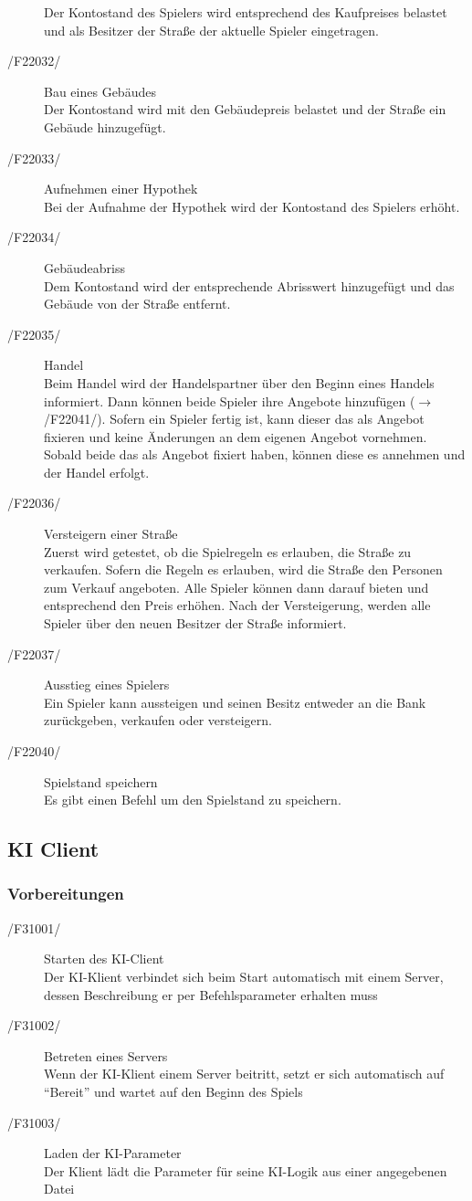 \documentclass[a4paper,10pt]{article}
\begin{document}
\begin{description}
Der Kontostand des Spielers wird entsprechend des Kaufpreises belastet und als Besitzer der Straße der aktuelle Spieler eingetragen.
\item[/F22032/] Bau eines Gebäudes \\
Der Kontostand wird mit den Gebäudepreis belastet und der Straße ein Gebäude hinzugefügt.
\item[/F22033/] Aufnehmen einer Hypothek \\
Bei der Aufnahme der Hypothek wird der Kontostand des Spielers erhöht.
\item[/F22034/] Gebäudeabriss \\
Dem Kontostand wird der entsprechende Abrisswert hinzugefügt und das Gebäude von der Straße entfernt.
\item[/F22035/] Handel \\
Beim Handel wird der Handelspartner über den Beginn eines Handels informiert. Dann können beide Spieler ihre Angebote hinzufügen ($\rightarrow$ /F22041/). Sofern ein Spieler fertig ist, kann dieser das als Angebot fixieren und keine Änderungen an dem eigenen Angebot vornehmen. Sobald beide das als Angebot fixiert haben, können diese es annehmen und der Handel erfolgt.
\item[/F22036/] Versteigern einer Straße \\
Zuerst wird getestet, ob die Spielregeln es erlauben, die Straße zu verkaufen. Sofern die Regeln es erlauben, wird die Straße den Personen zum Verkauf angeboten. Alle Spieler können dann darauf bieten und entsprechend den Preis erhöhen. Nach der Versteigerung, werden alle Spieler über den neuen Besitzer der Straße informiert.
\item[/F22037/] Ausstieg eines Spielers \\
Ein Spieler kann aussteigen und seinen Besitz entweder an die Bank zurückgeben, verkaufen oder versteigern.
\item[/F22040/] Spielstand speichern \\
Es gibt einen Befehl um den Spielstand zu speichern.
\end{description}

\subsection{KI Client}
\subsubsection{Vorbereitungen}
\begin{description}
\item[/F31001/]Starten des KI-Client\\
Der KI-Klient verbindet sich beim Start automatisch mit einem Server, dessen Beschreibung er per Befehlsparameter erhalten muss
\item[/F31002/]Betreten eines Servers\\
Wenn der KI-Klient einem Server beitritt, setzt er sich automatisch auf "`Bereit"' und wartet auf den Beginn des Spiels
\item[/F31003/] Laden der KI-Parameter \\
Der Klient lädt die Parameter für seine KI-Logik aus einer angegebenen Datei
\end{description}
\end{document}
